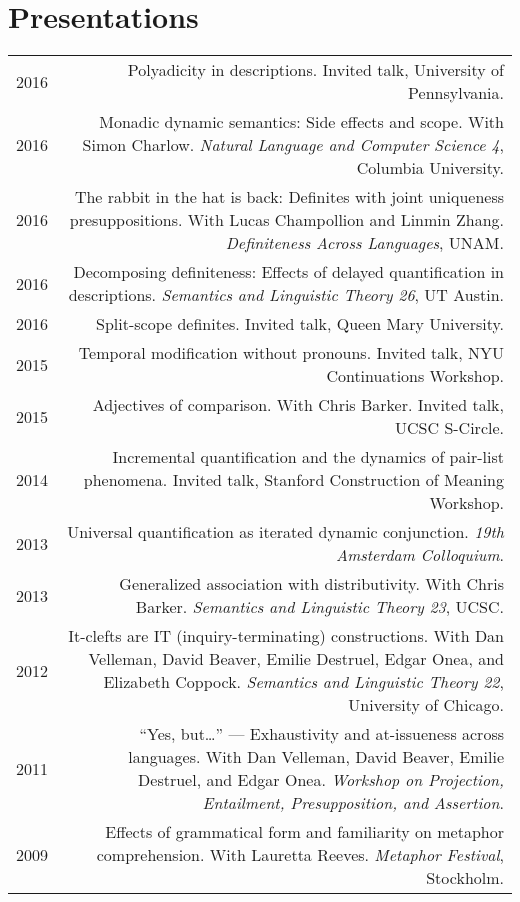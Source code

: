 \documentclass[12pt]{article}
\begin{document}
\section*{Presentations}

\begin{longtable}{LR}
  2016 &  Polyadicity in descriptions. Invited talk, University of
  Pennsylvania.\\
  2016 &  Monadic dynamic semantics: Side effects and scope. With Simon
          Charlow. \textit{Natural Language and Computer Science 4}, Columbia
          University.\\
  2016 &  The rabbit in the hat is back: Definites with joint uniqueness
          presuppositions. With Lucas Champollion and Linmin Zhang.
          \textit{Definiteness Across Languages}, UNAM.\\
  2016 &  Decomposing definiteness: Effects of delayed quantification in
          descriptions. \textit{Semantics and Linguistic Theory 26}, UT Austin.\\
  2016 &  Split-scope definites. Invited talk, Queen Mary University.\\
  2015 &  Temporal modification without pronouns. Invited talk, NYU
          Continuations Workshop.\\
  2015 &  Adjectives of comparison. With Chris Barker. Invited talk, UCSC
          S-Circle.\\
  2014 &  Incremental quantification and the dynamics of pair-list phenomena.
          Invited talk, Stanford Construction of Meaning Workshop.\\
  2013 &  Universal quantification as iterated dynamic conjunction. \textit{19th
          Amsterdam Colloquium}. \\
  2013 &  Generalized association with distributivity. With Chris Barker.
          \textit{Semantics and Linguistic Theory 23}, UCSC.\\
  2012 &  It-clefts are IT (inquiry-terminating) constructions. With Dan
          Velleman, David Beaver, Emilie Destruel, Edgar Onea, and Elizabeth
          Coppock. \textit{Semantics and Linguistic Theory 22}, University of
          Chicago.\\
  2011 &  ``Yes, but\dots'' --- Exhaustivity and at-issueness across languages.
           With Dan Velleman, David Beaver, Emilie Destruel, and Edgar Onea.
           \textit{Workshop on Projection, Entailment, Presupposition, and
           Assertion}.\\
  2009 &  Effects of grammatical form and familiarity on metaphor
          comprehension. With Lauretta Reeves. \textit{Metaphor Festival},
          Stockholm.
\end{longtable}
\end{document}
